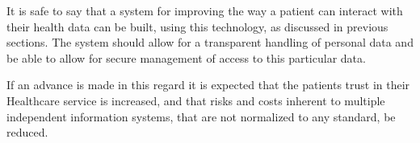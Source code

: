 \documentclass[]{llncs}
\begin{document}
It is safe to say that a system for improving the way a patient can interact
with their health data can be built, using this technology, as discussed in
previous sections.  The system should allow for a transparent handling of
personal data and be able to allow for secure management of access to this
particular data.

If an advance is made in this regard it is expected that the patients trust in
their Healthcare service is increased, and that risks and costs inherent to
multiple independent information systems, that are not normalized to any
standard, be reduced. 


\begingroup
\nocite{*}
\raggedright


\endgroup
\end{document}
